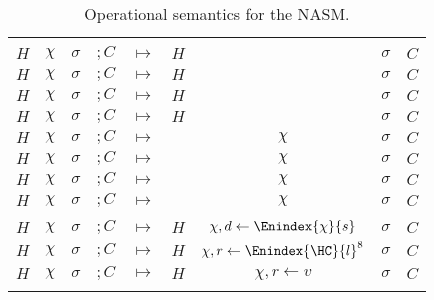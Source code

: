 \begin{xltabular}{\textwidth}{*{4}{>{\scriptsize}c}>{\tiny\bfseries}Y*{4}{>{\scriptsize}c}}
	\midrule

	 \\

	$H$ & $\chi$ & $\sigma$ & $; C$ & $\bm{\mapsto}$ & $H$ &  & $\sigma$ & $C$ \\
	$H$ & $\chi$ & $\sigma$ & $; C$ & $\bm{\mapsto}$ & $H$ &  & $\sigma$ & $C$ \\
	$H$ & $\chi$ & $\sigma$ & $;C$ & $\bm{\mapsto}$ & $H$ &  & $\sigma$ & $C$ \\
	$H$ & $\chi$ & $\sigma$ & $;C$ & $\bm{\mapsto}$ & $H$ &  & $\sigma$ & $C$ \\
	$H$ & $\chi$ & $\sigma$ & $; C$ & $\bm{\mapsto}$ &  & $\chi$ & $\sigma$ & $C$ \\
	$H$ & $\chi$ & $\sigma$ & $; C$ & $\bm{\mapsto}$ &  & $\chi$ & $\sigma$ & $C$ \\
	$H$ & $\chi$ & $\sigma$ & $; C$ & $\bm{\mapsto}$ &  & $\chi$ & $\sigma$ & $C$ \\
	$H$ & $\chi$ & $\sigma$ & $; C$ & $\bm{\mapsto}$ &  & $\chi$ & $\sigma$ & $C$ \\

	\midrule

	 \\

	$H$ & $\chi$ & $\sigma$ & $; C$ & $\bm{\mapsto}$ & $H$ & $\chi, d \gets \Enindex{\chi}{s}$ & $\sigma$ & $C$ \\
	$H$ & $\chi$ & $\sigma$ & $; C$ & $\bm{\mapsto}$ & $H$ & $\chi, r \gets {\Enindex{\HC}{l}}^{8}$ & $\sigma$ & $C$ \\
	$H$ & $\chi$ & $\sigma$ & $; C$ & $\bm{\mapsto}$ & $H$ & $\chi, r \gets v$ & $\sigma$ & $C$ \\

	\bottomrule

	\caption{Operational semantics for the NASM.}
	\label{fig:nstar-nsam-core-opsemantics}
\end{xltabular}



\endgroup
